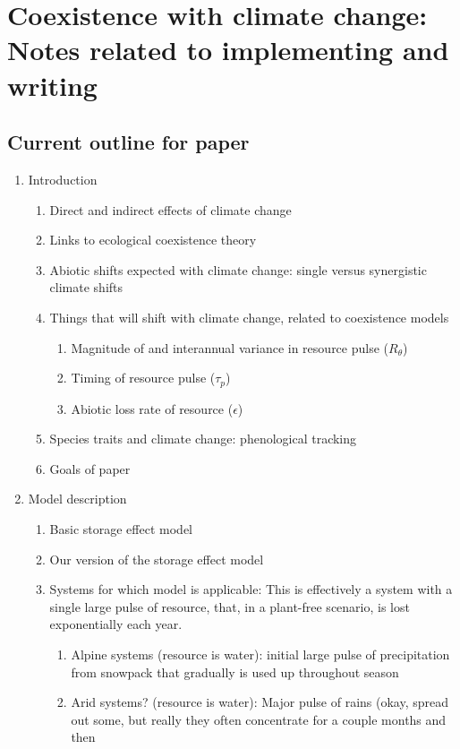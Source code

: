 \documentclass[11pt,a4paper,oneside]{article}
\begin{document}
\section{Coexistence with climate change: Notes related to implementing and writing}

\subsection{Current outline for paper}
\begin{enumerate}
\item Introduction
\begin{enumerate}
\item Direct and indirect effects of climate change
\item Links to ecological coexistence theory
\item Abiotic shifts expected with climate change: single versus
  synergistic climate shifts
\item Things that will shift with climate change, related to
  coexistence models
\begin{enumerate}
\item Magnitude of and interannual variance in resource pulse (\(R_{\theta}\))
\item Timing of resource pulse (\(\tau_{p}\))
\item Abiotic loss rate of resource (\(\epsilon\))
\end{enumerate}
\item Species traits and climate change: phenological tracking
\item Goals of paper
\end{enumerate}
\item Model description 
\begin{enumerate}
\item Basic storage effect model
\item Our version of the storage effect model
\item Systems for which model is applicable: This is effectively a system with a single large pulse of
resource, that, in a plant-free scenario, is lost exponentially each
year. 
\begin{enumerate}
\item Alpine systems (resource is water): initial large pulse of precipitation from
  snowpack that gradually is used up  throughout season
\item Arid systems? (resource is water): Major pulse of rains (okay, spread out some,
  but really they often concentrate for a couple months and then

\end{enumerate}
\end{enumerate}
\end{enumerate}
\end{document}

